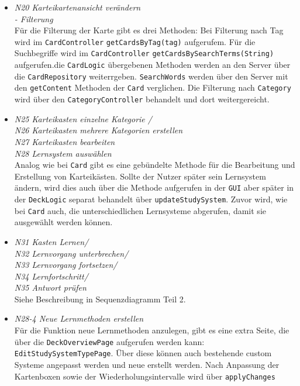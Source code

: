 \documentclass[fontsize=12pt,paper=A4,twoside]{scrartcl}
\begin{document}
\begin{itemize}
    \item \textit{N20 Karteikartenansicht verändern\\- Filterung}\\ 
    Für die Filterung der Karte gibt es drei Methoden: Bei Filterung nach Tag wird im \texttt{CardController} \texttt{getCardsByTag(tag)} aufgerufem.
    Für die Suchbegriffe wird im \texttt{CardController} \texttt{getCardsBySearchTerms(String)} aufgerufen.die \texttt{CardLogic} übergebenen Methoden werden an den Server über die \texttt{CardRepository} weiterrgeben. \texttt{SearchWords} werden über 
    den Server mit den \texttt{getContent} Methoden der \texttt{Card} verglichen.
    Die Filterung nach \texttt{Category} wird über den \texttt{CategoryController} behandelt und dort weitergereicht.
    \end{itemize}
    \begin{itemize}
    \item\textit{N25 Karteikasten einzelne Kategorie / \\
    N26 Karteikasten mehrere Kategorien erstellen\\
    N27 Karteikasten bearbeiten\\
    N28 Lernsystem auswählen}\\
    Analog wie bei \texttt{Card} gibt es eine gebündelte Methode für die Bearbeitung und Erstellung von Karteikästen.
    Sollte der Nutzer später sein Lernsystem ändern, wird dies auch über die Methode aufgerufen in der \texttt{GUI} aber später in der \texttt{DeckLogic}
    separat behandelt über \texttt{updateStudySystem}.
    Zuvor wird, wie bei \texttt{Card} auch, die unterschiedlichen Lernsysteme abgerufen, damit sie ausgewählt werden können.
    \item \textit{N31 Kasten Lernen/ \\
    N32 Lernvorgang unterbrechen/ \\
    N33 Lernvorgang fortsetzen/ \\
    N34 Lernfortschritt/ \\
    N35 Antwort prüfen} \\ Siehe Beschreibung in Sequenzdiagramm Teil 2.
    \item \textit{N28-4 Neue Lernmethoden erstellen}\\
    Für die Funktion neue Lernmethoden anzulegen, gibt es eine extra Seite, die über die \texttt{DeckOverviewPage} aufgerufen werden kann: \texttt{EditStudySystemTypePage}.
    Über diese können auch bestehende custom Systeme angepasst werden und neue erstellt werden. Nach Anpassung der Kartenboxen sowie der Wiederholungsintervalle wird über \texttt{applyChanges} 

\end{itemize}
\end{document}
